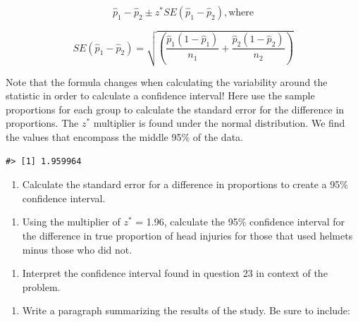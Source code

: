 \documentclass[
]{report}
\providecommand{\tightlist}{%
  \setlength{\itemsep}{0pt}\setlength{\parskip}{0pt}}
\begin{document}
\[\hat{p}_1-\hat{p}_2\pm z^*SE(\hat{p}_1-\hat{p}_2), \text{where}\]

\[SE(\hat{p}_1-\hat{p}_2) = \sqrt{\left(\frac{\hat{p}_1 (1-\hat{p}_1)}{n_1}+\frac{\hat{p}_2 (1-\hat{p}_2)}{n_2}\right)}\]

Note that the formula changes when calculating the variability around the statistic in order to calculate a confidence interval! Here use the sample proportions for each group to calculate the standard error for the difference in proportions. The \(z^*\) multiplier is found under the normal distribution. We find the values that encompass the middle 95\% of the data.

\begin{verbatim}
#> [1] 1.959964
\end{verbatim}

\begin{enumerate}
\def\labelenumi{\arabic{enumi}.}
\setcounter{enumi}{21}
\tightlist
\item
  Calculate the standard error for a difference in proportions to create a 95\% confidence interval.
\end{enumerate}

\vspace{1in}

\begin{enumerate}
\def\labelenumi{\arabic{enumi}.}
\setcounter{enumi}{22}
\tightlist
\item
  Using the multiplier of \(z^*\) = 1.96, calculate the 95\% confidence interval for the difference in true proportion of head injuries for those that used helmets minus those who did not.
\end{enumerate}

\vspace{1in}

\begin{enumerate}
\def\labelenumi{\arabic{enumi}.}
\setcounter{enumi}{23}
\tightlist
\item
  Interpret the confidence interval found in question 23 in context of the problem.
\end{enumerate}

\vspace{1in}

\begin{enumerate}
\def\labelenumi{\arabic{enumi}.}
\setcounter{enumi}{24}
\tightlist
\item
  Write a paragraph summarizing the results of the study. Be sure to include:
\end{enumerate}
\end{document}
